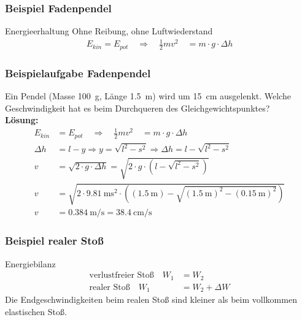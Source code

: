 \documentclass[12pt,oneside]{scrartcl}
\begin{document}
\frame
{
  \frametitle{Beispiel Fadenpendel}
  \begin{block}{Energieerhaltung}
  Ohne Reibung, ohne Luftwiederstand
	\begin{align*}
	E_{kin}=E_{pot}\quad\Rightarrow\quad \frac{1}{2}mv^2\quad=m\cdot g\cdot \Delta h
	\end{align*}
  \end{block}
}

\frame
{
  \frametitle{Beispielaufgabe Fadenpendel}
{
  Ein Pendel (Masse \SI{100}{\gram}, Länge \SI{1.5}{\meter}) wird um \SI{15}{\centi\meter} ausgelenkt. Welche Geschwindigkeit hat es beim Durchqueren des Gleichgewichtspunktes?\\
}
{
\textbf{Lösung:}	\begin{align*}
	E_{kin}&=E_{pot}\quad\Rightarrow\quad \frac{1}{2}mv^2\quad=m\cdot g\cdot \Delta h\\
	\Delta h&=l-y\Rightarrow y=\sqrt{l^2-s^2}\Rightarrow \Delta h=l-\sqrt{l^2-s^2}\\
	v&=\sqrt{2\cdot g\cdot \Delta h}=\sqrt{2\cdot g \cdot \left( l-\sqrt{l^2-s^2}\right)}\\
	v&=\sqrt{2\cdot \SI{9,81}{\meter\square\second} \cdot \left( (\SI{1.5}{\meter})-\sqrt{(\SI{1.5}{\meter})^2-(\SI{0.15}{\meter})^2}\right)}\\
	v&=\SI{0,384}{\meter\per\second}=\SI{38,4}{\centi\meter\per\second}
	\end{align*}
}
}

\frame
{
  \frametitle{Beispiel realer Stoß}
  \begin{block}{Energiebilanz}
	\begin{align*}
	\text{verlustfreier Stoß}
	\quad W_1&=W_2\\
	\text{realer Stoß}
	\quad W_1&=W_2+\Delta W
	\end{align*}
	Die Endgeschwindigkeiten beim realen Stoß sind kleiner als beim vollkommen elastischen Stoß.
  \end{block}
}
\end{document}
